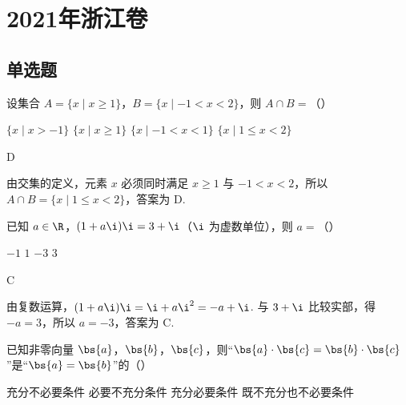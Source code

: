 
\chapter{2021年浙江卷}

\section{单选题}

\begin{problem}
设集合
\(A=\{x\mid x\ge 1\}\)，\(B=\{x\mid -1<x<2\}\)，则
\(A\cap B=\)（\quad）

\choices
    {\(\{x\mid x>-1\}\)}
    {\(\{x\mid x\ge 1\}\)}
    {\(\{x\mid -1<x<1\}\)}
    {\(\{x\mid 1\le x<2\}\)}
\end{problem}

\begin{answer}
D
\end{answer}

\begin{solution}
由交集的定义，元素 \(x\) 必须同时满足 \(x\geq1\) 与 \(-1<x<2\)，所以 \(A\cap B=\{x\mid1\leq x<2\}\)，答案为 D.
\end{solution}

\begin{problem}
已知 \(a\in\R\)，\((1+a\i)\i=3+\i\)（\(\i\) 为虚数单位），则
\(a=\)（\quad）

\choices
    {\(-1\)}
    {\(1\)}
    {\(-3\)}
    {\(3\)}
\end{problem}

\begin{answer}
C
\end{answer}

\begin{solution}
由复数运算，\((1+a\i)\i=\i+a\i^{2}=-a+\i\). 与 \(3+\i\) 比较实部，得 \(-a=3\)，所以 \(a=-3\)，答案为 C.
\end{solution}

\begin{problem}
已知非零向量 \(\bs{a}\)，\(\bs{b}\)，\(\bs{c}\)，则“\(\bs{a}\cdot\bs{c}=\bs{b}\cdot\bs{c}\)”是“\(\bs{a}=\bs{b}\)”的（\quad）

\choices
    {充分不必要条件}
    {必要不充分条件}
    {充分必要条件}
    {既不充分也不必要条件}
\end{problem}

